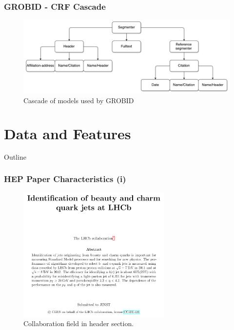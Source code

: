 \documentclass{beamer}
\begin{document}

\begin{frame}
\frametitle{GROBID - CRF Cascade}
\begin{figure}[h]
\center
\includegraphics[width=\textwidth]{Figures/cascade.pdf}
\caption{Cascade of models used by GROBID}
\end{figure}
\end{frame}


\section{Data and Features}


\begin{frame}[noframenumbering]{Outline}
\end{frame}


\begin{frame}
\frametitle{HEP Paper Characteristics (i)}
\begin{figure}[h]
\center
\includegraphics[width=3in]{Figures/collaboration.pdf}
\caption{Collaboration field in header section.}
\end{figure}
\end{frame}
\end{document}
